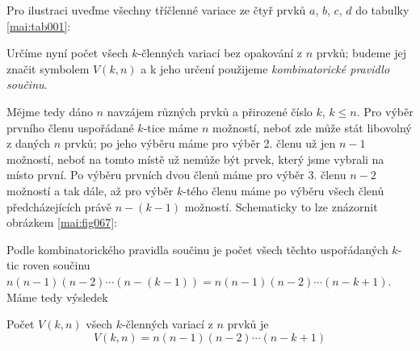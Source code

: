       Pro ilustraci uveďme všechny tříčlenné variace ze čtyř prvků \(a\), \(b\), \(c\), \(d\) do
      tabulky \ref{mai:tab001}:
      \begin{table}[ht!]      %
        \centering
        \caption{Tříčlenné variace ze čtyř prvků \(a\), \(b\), \(c\), \(d\)}
        \label{mai:tab001}
      \end{table}

      Určíme nyní počet všech \(k\)-členných variací bez opakování z \(n\) prvků; budeme jej značit
      symbolem \(V(k,n)\) a k jeho určení použijeme \emph{kombinatorické pravidlo součinu}.

      Mějme tedy dáno \(n\) navzájem různých prvků a přirozené číslo \(k\), \(k\leq n\). Pro výběr
      prvního členu uspořádané \(k\)-tice máme \(n\) možností, neboť zde může stát libovolný z
      daných \(n\) prvků; po jeho výběru máme pro výběr 2. členu už jen \(n - 1\) možností, neboť na
      tomto místě už nemůže být prvek, který jsme vybrali na místo první. Po výběru prvních dvou
      členů máme pro výběr 3. členu \(n - 2\) možností a tak dále, až pro výběr \(k\)-tého členu
      máme po výběru všech členů předcházejících právě \(n - (k - 1)\) možností. Schematicky to lze
      znázornit obrázkem \ref{mai:fig067}:


      Podle kombinatorického pravidla součinu je počet všech těchto uspořádaných \(k\)-tic roven
      součinu \(n(n-1)(n-2)\cdots(n-(k-1)) = n(n-1)(n-2)\cdots(n - k + 1)\). Máme tedy výsledek

      \begin{mdframed}[style=highlight]
        Počet \(V(k,n)\) všech \(k\)-členných variací z \(n\) prvků je
        \begin{equation*}
          V(k,n) = n(n-1)(n-2)\cdots(n - k + 1)
        \end{equation*}
      \end{mdframed} 

